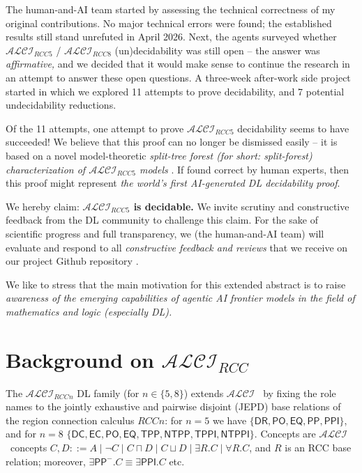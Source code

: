 \documentclass[
]{ceurart}
\theoremstyle{definition}
\newcommand{\ALCI}{\ensuremath{\mathcal{ALCI}}}
\newcommand{\ALCIRCC}[1]{\ensuremath{\mathcal{ALCI}_{\mathit{RCC#1}}}}
\newcommand{\DR}{\ensuremath{\mathsf{DR}}}
\newcommand{\PO}{\ensuremath{\mathsf{PO}}}
\newcommand{\EQ}{\ensuremath{\mathsf{EQ}}}
\newcommand{\PP}{\ensuremath{\mathsf{PP}}}
\newcommand{\PPI}{\ensuremath{\mathsf{PPI}}}
\newcommand{\TPP}{\ensuremath{\mathsf{TPP}}}
\newcommand{\NTPP}{\ensuremath{\mathsf{NTPP}}}
\newcommand{\TPPI}{\ensuremath{\mathsf{TPPI}}}
\newcommand{\NTPPI}{\ensuremath{\mathsf{NTPPI}}}
\newcommand{\DC}{\ensuremath{\mathsf{DC}}}
\newcommand{\EC}{\ensuremath{\mathsf{EC}}}
\begin{document}
\noindent The human-and-AI team started by assessing the technical
correctness of my original contributions. No major technical errors
were found; the established results still stand unrefuted in April
2026.  Next, the agents surveyed whether $\ALCIRCC{5}$ / $\ALCIRCC{8}$
(un)decidability was still open -- the answer was \emph{affirmative,}
and we decided that it would make sense to continue the research in an
attempt to answer these open questions. A three-week after-work side
project started in which we explored 11 attempts to prove
decidability, and 7 potential undecidability reductions.

Of the 11 attempts, one attempt to prove \ALCIRCC{5} decidability
seems to have succeeded! We believe that this proof can no longer be
dismissed easily -- it is based on a novel model-theoretic 
\emph{split-tree forest (for short: split-forest) characterization of
\ALCIRCC{5} models} \cite{SiblingCompleted, CompletenessExtraction}.
If found correct by human experts, then this proof might represent 
\emph{the world's first AI-generated DL decidability proof}.

We hereby claim: \textbf{$\ALCIRCC{5}$ is decidable.}  We invite
scrutiny and constructive feedback from the DL community to challenge
this claim. For the sake of scientific progress and full transparency,
we (the human-and-AI team) will evaluate and respond to all
\emph{constructive feedback and reviews} that we receive on our
project Github repository \cite{ALCIRCC5Repo}.

We like to stress that the main motivation for this extended abstract
is to raise \emph{awareness of the emerging capabilities of agentic AI
frontier models in the field of mathematics and logic (especially DL).}

\section{Background on $\ALCIRCC{}$}
\label{sec:ea-background}

                             
The \ALCIRCC{n} DL family \cite{Wessel2002, Wessel2003} (for $n \in
\{5,8\}$) extends \ALCI\ \cite{DLHandbook2007} by fixing the role
names to the jointly exhaustive and pairwise disjoint (JEPD) base
relations of the region connection calculus $\mathit{RCC}n$: for $n=5$
we have $\{\DR,\PO,\EQ,\PP,\PPI\}$, and for $n=8$
$\{\DC,\EC,\PO,\EQ,\TPP,\NTPP,\TPPI,\NTPPI\}$. Concepts are 
\ALCI\ concepts $C,D ::= A \mid \neg C \mid C \sqcap D \mid C
\sqcup D \mid \exists R.C \mid \forall R.C$, and $R$ is an  
RCC base relation; moreover, $\exists \PP^{-}.C \equiv
\exists \PPI.C$ etc.
\end{document}

